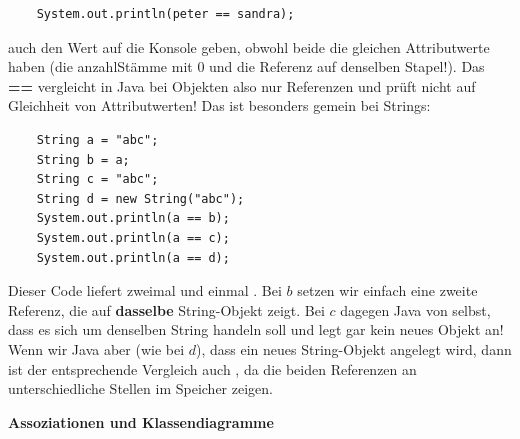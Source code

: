 \documentclass[fontsize=12pt]{article}
\begin{document}
\begin{verbatim}
    System.out.println(peter == sandra);
\end{verbatim}
auch den Wert  auf die Konsole geben, obwohl beide die gleichen Attributwerte haben (die anzahlStämme mit 0 und die Referenz auf denselben Stapel!). Das \textbf{==} vergleicht in Java bei Objekten also nur Referenzen und prüft nicht auf Gleichheit von Attributwerten! Das ist besonders gemein bei Strings:
\begin{verbatim}
    String a = "abc";
    String b = a;
    String c = "abc";
    String d = new String("abc");
    System.out.println(a == b);
    System.out.println(a == c);
    System.out.println(a == d);
\end{verbatim}
Dieser Code liefert zweimal  und einmal . Bei $b$ setzen wir einfach eine zweite Referenz, die auf \textbf{dasselbe} String-Objekt zeigt. Bei $c$ dagegen  Java von selbst, dass es sich um denselben String handeln soll und legt gar kein neues Objekt an! Wenn wir Java aber  (wie bei $d$), dass ein neues String-Objekt angelegt wird, dann ist der entsprechende Vergleich auch , da die beiden Referenzen an unterschiedliche Stellen im Speicher zeigen. 

\newpage 

\huge\textbf{Assoziationen und Klassendiagramme}\normalsize \\
\end{document}
